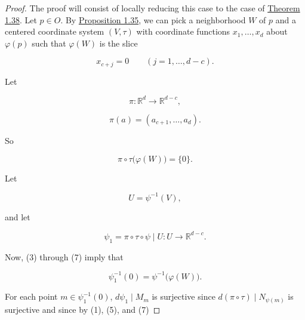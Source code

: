\begin{proof}
	The proof will consist of locally reducing this case to the case of \hyperref[thm:1.38]{Theorem 1.38}. Let $p \in O$. By \hyperref[thm:1.35]{Proposition 1.35}, we can pick a neighborhood $W$ of $p$ and a centered coordinate system $(V, \tau)$ with coordinate functions $x_{1}, \ldots, x_{d}$ about $\varphi(p)$ such that $\varphi(W)$ is the slice



	\begin{equation}
		\tag{3}\label{eq:1.39:3}
		x_{c+j}=0\qquad(j=1,\ldots,d-c).
	\end{equation}

	Let

	\[
		\pi\colon\mathbb{R}^{d}\to\mathbb{R}^{d-c},
	\]

	\begin{equation}
		\tag{4}\label{eq:1.39:4}
		\pi(a)=(a_{c+1},\ldots,a_{d}).
	\end{equation}

	So



	\begin{equation}
		\tag{5}\label{eq:1.39:5}
		\pi\circ\tau\bigl(\varphi(W)\bigr)=\{0\}.
	\end{equation}

	Let



	\begin{equation}
		\tag{6}\label{eq:1.39:6}
		U=\psi^{-1}(V),
	\end{equation}

	and let



	\begin{equation}
		\tag{7}\label{eq:1.39:7}
		\psi_{1}=\pi\circ\tau\circ\psi\mid U\colon U\to\mathbb{R}^{d-c}.
	\end{equation}

	\begin{center}
	\end{center}

	Now, (3) through (7) imply that

	\begin{equation}
		\tag{8}\label{eq:1.39:8}
		\psi_{1}^{-1}(0)=\psi^{-1}\big(\varphi(W)\big).
	\end{equation}

	For each point  $ m \in \psi_{1}^{-1}(0) $,  $ d\psi_{1} \mid M_{m} $ is surjective since  $ d(\pi \circ \tau) \mid N_{\psi(m)} $ is surjective and since by (1), (5), and (7)


\end{proof}
